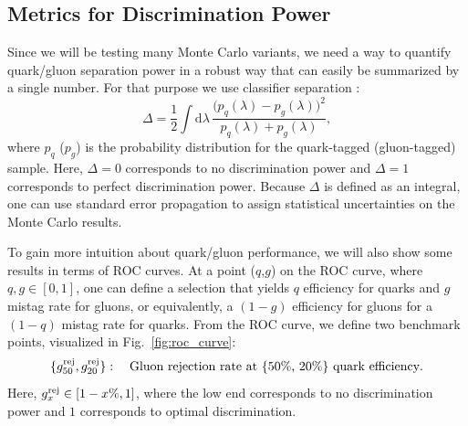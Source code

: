 \documentclass[11pt,letterpaper]{article}
\newcommand{\df}{\text{d}}
\DeclareRobustCommand{\Fig}[1]{Fig.~\ref{#1}}
\newcommand{\be}{\begin{equation}}
\newcommand{\ee}{\end{equation}}
\newcommand{\jdt}[1]{\textbf{\textcolor{darkgreen}{(#1 --jdt)}}}
\begin{document}
\subsection{Metrics for Discrimination Power}

Since we will be testing many Monte Carlo variants, we need a way to quantify quark/gluon separation power in a robust way that can easily be summarized by a single number.  For that purpose we use classifier separation \cite{}:
\be
\Delta =  \frac{1}{2} \int \df \lambda \, \frac{\bigl(p_q(\lambda) - p_g(\lambda)\bigr)^2}{p_q(\lambda) + p_g(\lambda)},
\ee
where $p_q$ ($p_g$) is the probability distribution for the quark-tagged (gluon-tagged) sample.  Here, $\Delta = 0$ corresponds to no discrimination power and $\Delta = 1$ corresponds to perfect discrimination power.  Because $\Delta$ is defined as an integral, one can use standard error propagation to assign statistical uncertainties on the Monte Carlo results.

To gain more intuition about quark/gluon performance, we will also show some results in terms of ROC curves.  At a point ($q$,$g$) on the ROC curve, where $q,g \in [0,1]$, one can define a selection that yields $q$ efficiency for quarks and $g$ mistag rate for gluons, or equivalently, a $(1-g)$ efficiency for gluons for a $(1-q)$ mistag rate for quarks.  From the ROC curve, we define two benchmark points, visualized in \Fig{fig:roc_curve}:
\be
\{ g^{\rm  rej}_{50} ,   g^{\rm  rej}_{20}\} : \quad \text{Gluon rejection rate at \{50\%, 20\%\} quark efficiency}. \\
\ee
Here, $g_x^{\rm rej} \in [1- x\%,1]$, where the low end corresponds to no discrimination power and $1$ corresponds to optimal discrimination.

\end{document}

